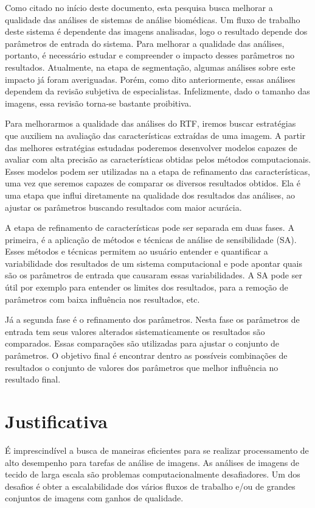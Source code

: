 \documentclass[a4paper,10pt]{article}
\begin{document}
Como citado no início deste documento, esta pesquisa busca melhorar a qualidade das análises de sistemas de análise biomédicas. Um fluxo de trabalho deste sistema é dependente das imagens analisadas, logo o resultado depende dos parâmetros de entrada do sistema. Para melhorar a qualidade das análises, portanto, é necessário estudar e compreender o impacto desses parâmetros no resultados. Atualmente, na etapa de segmentação, algumas análises sobre este impacto já foram averiguadas. Porém, como dito anteriormente, essas análises dependem da revisão subjetiva de especialistas. Infelizmente, dado o tamanho das imagens, essa revisão torna-se bastante proibitiva. 

Para melhorarmos a qualidade das análises do RTF, iremos buscar estratégias que auxiliem na avaliação das características extraídas de uma imagem. A partir das melhores estratégias estudadas poderemos desenvolver modelos capazes de avaliar com alta precisão as características obtidas pelos métodos computacionais. Esses modelos podem ser utilizadas na a etapa de refinamento das características, uma vez que seremos capazes de comparar os diversos resultados obtidos. Ela é uma etapa que influi diretamente na qualidade dos resultados das análises, ao ajustar os parâmetros buscando resultados com maior acurácia.


A etapa de refinamento de características pode ser separada em duas fases. A primeira, é a aplicação de métodos e técnicas de análise de sensibilidade (SA). Esses métodos e técnicas permitem ao usuário entender e quantificar a variabilidade dos resultados de um sistema computacional e pode apontar quais são os parâmetros de entrada que causaram essas variabilidades. A SA pode ser útil por exemplo para entender os limites dos resultados, para a remoção de parâmetros com baixa influência nos resultados, etc.

Já a segunda fase é o refinamento dos parâmetros. Nesta fase os parâmetros de entrada tem seus valores alterados sistematicamente os resultados são comparados. Essas comparações são utilizadas para ajustar o conjunto de parâmetros. O objetivo final é encontrar dentro as possíveis combinações de resultados o conjunto de valores dos parâmetros que melhor influência no resultado final.


\section{Justificativa}

É imprescindível a busca de maneiras eficientes para se realizar processamento de alto desempenho para tarefas de análise de imagens. As análises de imagens de tecido de larga escala são problemas computacionalmente desafiadores. Um dos desafios é obter a escalabilidade dos vários fluxos de trabalho e/ou de grandes conjuntos de imagens com ganhos de qualidade. 
\end{document}
